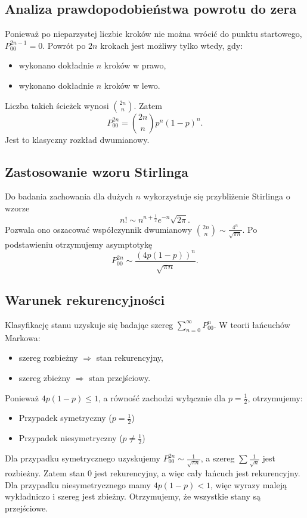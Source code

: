 \subsection{Analiza prawdopodobieństwa powrotu do zera}
Ponieważ po nieparzystej liczbie kroków nie można wrócić do punktu startowego, $P_{00}^{2n-1}=0$. Powrót po $2n$ krokach jest możliwy tylko wtedy, gdy:
\begin{itemize}
    \item wykonano dokładnie $n$ kroków w prawo,
    \item wykonano dokładnie $n$ kroków w lewo.
\end{itemize}
Liczba takich ścieżek wynosi $\binom{2n}{n}$. Zatem
$$P_{00}^{2n}=\binom{2n}{n}p^n(1-p)^n.$$
Jest to klasyczny rozkład dwumianowy.

\subsection{Zastosowanie wzoru Stirlinga}
Do badania zachowania dla dużych $n$ wykorzystuje się przybliżenie Stirlinga o wzorze
$$n!\sim n^{n+\frac{1}{2}}e^{-n}\sqrt{2\pi}.$$
Pozwala ono oszacować współczynnik dwumianowy $\binom{2n}{n} \sim \frac{4^n}{\sqrt{\pi n}}$. Po podstawieniu otrzymujemy asymptotykę
$$P_{00}^{2n} \sim \frac{(4p(1-p))^n}{\sqrt{\pi n}}.$$

\subsection{Warunek rekurencyjności}
Klasyfikację stanu uzyskuje się badając szereg $\sum_{n=0}^{\infty}P_{00}^n$. W teorii łańcuchów Markowa:
\begin{itemize}
    \item szereg rozbieżny $\Rightarrow$ stan rekurencyjny,
    \item szereg zbieżny $\Rightarrow$ stan przejściowy.
\end{itemize}
Ponieważ $4p(1-p) \leq 1$, a równość zachodzi wyłącznie dla $p=\frac{1}{2}$, otrzymujemy:
\begin{itemize}
    \item Przypadek symetryczny ($p=\frac{1}{2}$)
    \item Przypadek niesymetryczny ($p \neq \frac{1}{2}$)
\end{itemize}
Dla przypadku symetrycznego uzyskujemy $P_{00}^{2n} \sim \frac{1}{\sqrt{\pi n}}$, a szereg $\sum \frac{1}{\sqrt{n}}$ jest rozbieżny. Zatem stan $0$ jest rekurencyjny, a więc cały łańcuch jest rekurencyjny. Dla przypadku niesymetrycznego mamy $4p(1-p)<1$, więc wyrazy maleją wykładniczo i szereg jest zbieżny. Otrzymujemy, że wszystkie stany są przejściowe.

